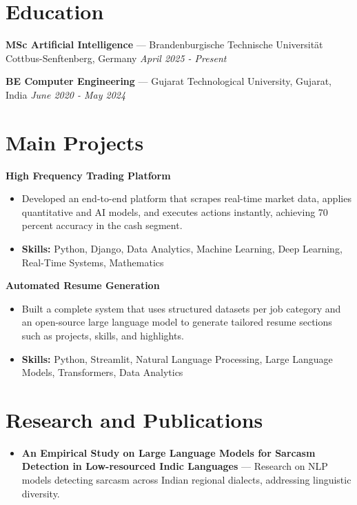 \documentclass[a4paper,10pt]{article}
\begin{document}
\section*{Education}
\textbf{MSc Artificial Intelligence} — Brandenburgische Technische Universität Cottbus-Senftenberg, Germany \hfill \textit{April 2025 - Present}\par
\vspace{1.5pt}
\textbf{BE Computer Engineering} — Gujarat Technological University, Gujarat, India \hfill \textit{June 2020 - May 2024}\par

\section*{Main Projects}
\textbf{High Frequency Trading Platform}\par
\vspace{1pt}
\begin{itemize}
  \item Developed an end-to-end platform that scrapes real-time market data, applies quantitative and AI models, and executes actions instantly, achieving 70 percent accuracy in the cash segment.
  \item \textbf{Skills:} Python, Django, Data Analytics, Machine Learning, Deep Learning, Real-Time Systems, Mathematics
\end{itemize}
\vspace{3pt}
\textbf{Automated Resume Generation}\par
\vspace{1pt}
\begin{itemize}
  \item Built a complete system that uses structured datasets per job category and an open-source large language model to generate tailored resume sections such as projects, skills, and highlights.
  \item \textbf{Skills:} Python, Streamlit, Natural Language Processing, Large Language Models, Transformers, Data Analytics
\end{itemize}

\section*{Research and Publications}
\begin{itemize}
\item \textbf{An Empirical Study on Large Language Models for Sarcasm Detection in Low-resourced Indic Languages} — Research on NLP models detecting sarcasm across Indian regional dialects, addressing linguistic diversity.
\end{itemize}
\end{document}
